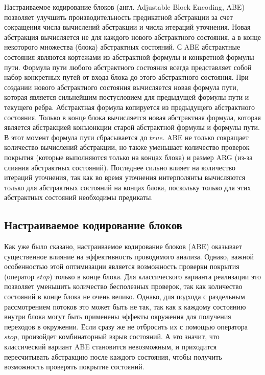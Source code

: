 Настраиваемое кодирование блоков (англ. Adjustable Block Encoding, ABE)~\cite{Beyer10} позволяет улучшить производительность предикатной абстракции за счет сокращения числа вычислений абстракции и числа итераций уточнения.
Новая абстракция вычисляется не для каждого нового абстрактного состояния, а в конце некоторого множества (блока) абстрактных состояний.
С ABE абстрактные состояния являются кортежами из абстрактной формулы и конкретной формулы пути.
Формула пути любого абстрактного состояния всегда представляет собой набор конкретных путей от входа блока до этого абстрактного состояния.
При создании нового абстрактного состояния вычисляется новая формула пути, которая является сильнейшим постусловием для предыдущей формулы пути и текущего ребра. Абстрактная формула копируется из предыдущего абстрактного состояния. 
Только в конце блока вычисляется новая абстрактная формула, которая является абстракцией конъюнкции старой абстрактной формулы и формулы пути.
В этот момент формула пути сбрасывается до $true$.
ABE не только сокращает количество вычислений абстракции, но также уменьшает количество проверок покрытия (которые выполняются только на концах блока) и размер ARG (из-за слияния абстрактных состояний).
Последнее сильно влияет на количество итераций уточнения, так как во время уточнения интерполянты вычисляются только для абстрактных состояний на концах блока, поскольку только для этих абстрактных состояний необходимы предикаты.

\subsection{Настраиваемое кодирование блоков}
\label{sect_predicate_abe}
Как уже было сказано, настраиваемое кодирование блоков (ABE) оказывает существенное влияние на эффективность проводимого анализа.
Однако, важной особенностью этой оптимизации является возможность проверки покрытия (оператор $stop$) только в конце блока. 
Для классического варианта реализации это позволяет уменьшить количество бесполезных проверок, так как количество состояний в конце блока не очень велико.
Однако, для подхода с раздельным рассмотрением потоков это может быть не так, так как к каждому состоянию внутри блока могут быть применены эффекты окружения для получения переходов в окружении. 
Если сразу же не отбросить их с помощью оператора $stop$, произойдет комбинаторный взрыв состояний.
А это значит, что классический вариант ABE становится невозможным, и приходится пересчитывать абстракцию после каждого состояния, чтобы получить возможность проверять покрытие состояний.

